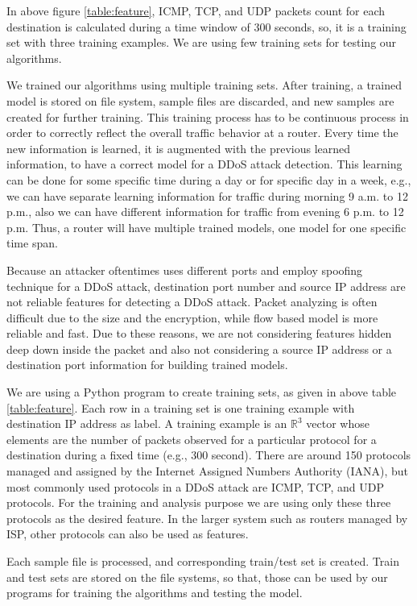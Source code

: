 \documentclass[12pt,oneside,a4paper]{article}
\begin{document}
In above figure \ref{table:feature}, ICMP, TCP, and UDP packets count for each destination is calculated during a time window of 300 seconds, so, it is a training set with three training examples. We are using few training sets for testing our algorithms.

We trained our algorithms using multiple training sets. After training, a trained model is stored on file system, sample files are discarded, and new samples are created for further training. This training process has to be continuous process in order to correctly reflect the overall traffic behavior at a router. Every time the new information is learned, it is augmented with the previous learned information, to have a correct model for a DDoS attack detection. This learning can be done for some specific time during a day or for specific day in a week, e.g., we can have separate learning information for traffic during morning 9 a.m. to 12 p.m., also we can have different information for traffic from evening 6 p.m. to 12 p.m. Thus, a router will have multiple trained models, one model for one specific time span.

Because an attacker oftentimes uses different ports and employ spoofing technique for a DDoS attack, destination port number and source IP address are not reliable features for detecting a DDoS attack. Packet analyzing is often difficult due to the size and the encryption, while flow based model is more reliable and fast. Due to these reasons, we are not considering features hidden deep down inside the packet and also not considering a source IP address or a destination port information for building trained models.

We are using a Python program to create training sets, as given in above table \ref{table:feature}. Each row in a training set is one training example with destination IP address as label. A training example is an $\mathbb{R}^3$ vector whose elements are the number of packets observed for a particular protocol for a destination during a fixed time (e.g., 300 second). There are around 150 protocols managed and assigned by the Internet Assigned Numbers Authority (IANA), but most commonly used protocols in a DDoS attack are ICMP, TCP, and UDP protocols. For the training and analysis purpose we are using only these three protocols as the desired feature. In the larger system such as routers managed by ISP, other protocols can also be used as features.

Each sample file is processed, and corresponding train/test set is created. Train and test sets are stored on the file systems, so that, those can be used by our programs for training the algorithms and testing the model.
\end{document}
